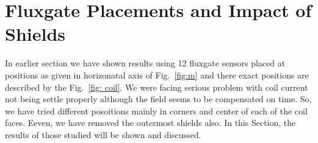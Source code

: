 












\section{Fluxgate Placements and Impact of Shields}


In earlier section we have shown results using 12 fluxgate sensors placed at positions as given in horizonatal axis of Fig.~\ref{fig:m} and there exact positions are described by the Fig.~\ref{fig: coil}. We were facing serious problem with coil current not being settle properly although the field seems to be compensated on time. So, we have tried different posoitions mainly in corners and center of each of the coil faces. Eeven, we have removed the outermost shields also. In this Section, the results of those studied will be shown and discussed. 

